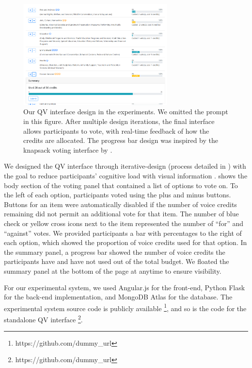 \begin{figure}[htpb]
    \centering
    \includegraphics[width=0.7\textwidth, keepaspectratio=true]{content/image/qv-donation.png}
    \caption{
        Our QV interface design in the experiments. 
        We omitted the prompt in this figure.
        After multiple design iterations, 
        the final interface allows participants to vote, with real-time feedback of how the credits are allocated. 
        The progress bar design was inspired by the knapsack voting interface by \cite{goel2015knapsack}.
    }
    \label{fig:qv_donation}
\end{figure}

We designed the QV interface through iterative-design (process detailed in ) with the goal to reduce participants' cognitive load with visual information \cite{oviatt2006human}.  shows the body section of the voting panel that contained a list of options to vote on. To the left of each option, participants voted using the plus and minus buttons. Buttons for an item were automatically disabled if the number of voice credits remaining did not permit an additional vote for that item. The number of blue check or yellow cross icons next to the item represented the number of ``for'' and ``against'' votes. We provided participants a bar with percentages to the right of each option, which showed the proportion of voice credits used for that option.  In the summary panel, a progress bar showed the number of voice credits the participants have and have not used out of the total budget. We floated the summary panel at the bottom of the page at anytime to ensure visibility.

For our experimental system, we used Angular.js for the front-end, Python Flask for the back-end implementation, and MongoDB Atlas for the database. The experimental system source code is publicly available \footnote{https://github.com/dummy\_url}, and so is the code for the standalone QV interface \footnote{https://github.com/dummy\_url}. 



